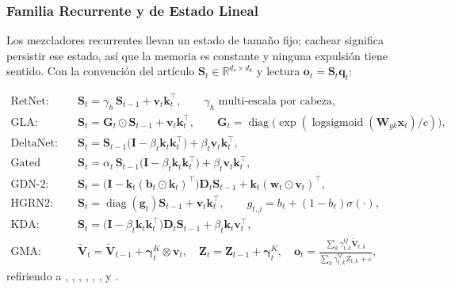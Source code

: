 \subsubsection{Familia Recurrente y de Estado Lineal}

Los mezcladores recurrentes llevan un estado de tamaño fijo; cachear significa persistir ese estado, así que la memoria es constante y ninguna expulsión tiene sentido. Con la convención del artículo $\mathbf{S}_t \in \mathbb{R}^{d_v\times d_k}$ y lectura $\mathbf{o}_t = \mathbf{S}_t\mathbf{q}_t$:

\begin{align}
\text{RetNet:}\quad & \mathbf{S}_t = \gamma_h\,\mathbf{S}_{t-1} + \mathbf{v}_t\mathbf{k}_t^\top, \qquad \gamma_h \text{ multi-escala por cabeza}, \\
\text{GLA:}\quad & \mathbf{S}_t = \mathbf{G}_t \odot \mathbf{S}_{t-1} + \mathbf{v}_t\mathbf{k}_t^\top, \qquad \mathbf{G}_t = \operatorname{diag}\big(\exp(\operatorname{logsigmoid}(\mathbf{W}_{gk}\mathbf{x}_t)/c)\big), \\
\text{DeltaNet:}\quad & \mathbf{S}_t = \mathbf{S}_{t-1}\big(\mathbf{I} - \beta_t\mathbf{k}_t\mathbf{k}_t^\top\big) + \beta_t\mathbf{v}_t\mathbf{k}_t^\top, \\
\text{Gated DeltaNet:}\quad & \mathbf{S}_t = \alpha_t\,\mathbf{S}_{t-1}\big(\mathbf{I} - \beta_t\mathbf{k}_t\mathbf{k}_t^\top\big) + \beta_t\mathbf{v}_t\mathbf{k}_t^\top, \\
\text{GDN-2:}\quad & \mathbf{S}_t = \big(\mathbf{I} - \mathbf{k}_t(\mathbf{b}_t\odot\mathbf{k}_t)^\top\big)\mathbf{D}_t\mathbf{S}_{t-1} + \mathbf{k}_t(\mathbf{w}_t\odot\mathbf{v}_t)^\top, \\
\text{HGRN2:}\quad & \mathbf{S}_t = \operatorname{diag}(\mathbf{g}_t)\mathbf{S}_{t-1} + \mathbf{v}_t\mathbf{k}_t^\top, \qquad g_{t,j} = b_\ell + (1-b_\ell)\sigma(\cdot), \\
\text{KDA:}\quad & \mathbf{S}_t = \big(\mathbf{I} - \beta_t\mathbf{k}_t\mathbf{k}_t^\top\big)\mathbf{D}_t\mathbf{S}_{t-1} + \beta_t\mathbf{k}_t\mathbf{v}_t^\top, \\
\text{GMA:}\quad & \tilde{\mathbf{V}}_t = \tilde{\mathbf{V}}_{t-1} + \boldsymbol{\gamma}^{K}_t \otimes \mathbf{v}_t,\quad \mathbf{Z}_t = \mathbf{Z}_{t-1} + \boldsymbol{\gamma}^{K}_t, \quad \mathbf{o}_t = \frac{\sum_k \gamma^{Q}_{t,k}\tilde{\mathbf{V}}_{t,k}}{\sum_k \gamma^{Q}_{t,k}Z_{t,k} + \varepsilon},
\end{align}
refiriendo a \citet{sun_retentive_2023}, \citet{yang_gla_2023}, \citet{yang_deltanet_2024}, \citet{yang_gated_deltanet_2024}, \citet{hatamizadeh_gated_deltanet2_2026}, \citet{qin_hgrn2_2024}, \citet{kimi_kda_2025} y \citet{huang_gma_2026}.

